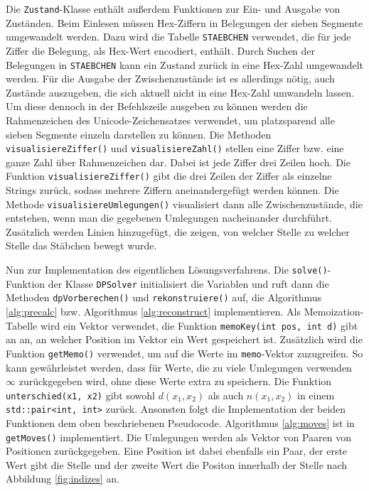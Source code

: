 \documentclass[a4paper,10pt,ngerman]{scrartcl}
\begin{document}
Die \lstinline{Zustand}-Klasse enthält außerdem Funktionen zur Ein- und Ausgabe von Zuständen. Beim Einlesen müssen Hex-Ziffern in Belegungen der sieben Segmente umgewandelt werden. Dazu wird die Tabelle \lstinline{STAEBCHEN} verwendet, die für jede Ziffer die Belegung, als Hex-Wert encodiert, enthält. 
Durch Suchen der Belegungen in \lstinline{STAEBCHEN} kann ein Zustand zurück in eine Hex-Zahl umgewandelt werden. 
Für die Ausgabe der Zwischenzustände ist es allerdings nötig, auch Zustände auszugeben, die sich aktuell nicht in eine Hex-Zahl umwandeln lassen.
Um diese dennoch in der Befehlszeile ausgeben zu können werden die Rahmenzeichen des Unicode-Zeichensatzes verwendet, um platzsparend alle sieben Segmente einzeln darstellen zu können.
Die Methoden \lstinline{visualisiereZiffer()} und \lstinline{visualisiereZahl()} stellen eine Ziffer bzw. eine ganze Zahl über Rahmenzeichen dar. 
Dabei ist jede Ziffer drei Zeilen hoch.
Die Funktion \lstinline{visualisiereZiffer()} gibt die drei Zeilen der Ziffer als einzelne Strings zurück, sodass mehrere Ziffern aneinandergefügt werden können.
Die Methode \lstinline{visualisiereUmlegungen()} visualisiert dann alle Zwischenzustände, die entstehen, wenn man die gegebenen Umlegungen nacheinander durchführt. Zusätzlich werden Linien hinzugefügt, die zeigen, von welcher Stelle zu welcher Stelle das Stäbchen bewegt wurde. 

Nun zur Implementation des eigentlichen Lösungsverfahrens. 
Die \lstinline{solve()}-Funktion  der Klasse \lstinline{DPSolver} initialisiert die Variablen und ruft dann die Methoden \lstinline{dpVorberechen()} und \lstinline{rekonstruiere()}  auf, die Algorithmus \ref*{alg:precalc} bzw. Algorithmus \ref{alg:reconstruct} implementieren.
Als Memoization-Tabelle wird ein Vektor verwendet, die Funktion \lstinline{memoKey(int pos, int d)} gibt an an, an welcher Position im Vektor ein Wert gespeichert ist. 
Zusätzlich wird die Funktion \lstinline{getMemo()} verwendet, um auf die Werte im \lstinline{memo}-Vektor zuzugreifen. 
So kann gewährleistet werden, dass für Werte, die zu viele Umlegungen verwenden $\infty$ zurückgegeben wird, ohne diese Werte extra zu speichern. 
Die Funktion \lstinline{unterschied(x1, x2)} gibt sowohl $d(x_1, x_2)$ als auch $n(x_1, x_2)$ in einem \lstinline{std::pair<int, int>} zurück. 
Ansonsten folgt die Implementation der beiden Funktionen dem oben beschriebenen Pseudocode. 
Algorithmus \ref{alg:moves} ist in \lstinline{getMoves()} implementiert. 
Die Umlegungen werden als Vektor von Paaren von Positionen zurückgegeben.
Eine Position ist dabei ebenfalls ein Paar, der erste Wert gibt die Stelle und der zweite Wert die Positon innerhalb der Stelle nach Abbildung \ref{fig:indizes} an.
\end{document}

